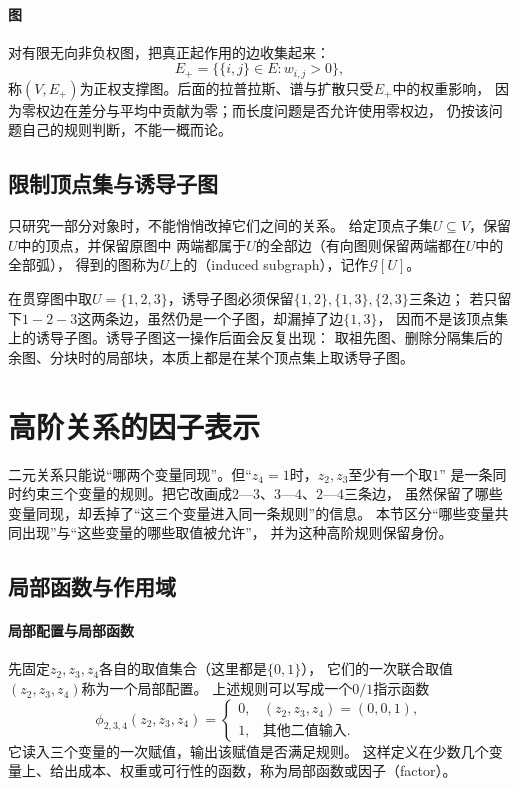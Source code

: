 \paragraph{图}
对有限无向非负权图，把真正起作用的边收集起来：
\[
  E_+=\bigl\{\{i,j\}\in E:w_{i,j}>0\bigr\},
\]
称$(V,E_+)$为正权支撑图。后面的拉普拉斯、谱与扩散只受$E_+$中的权重影响，
因为零权边在差分与平均中贡献为零；而长度问题是否允许使用零权边，
仍按该问题自己的规则判断，不能一概而论。

\subsection{限制顶点集与诱导子图}

只研究一部分对象时，不能悄悄改掉它们之间的关系。
给定顶点子集$U\subseteq V$，保留$U$中的顶点，并保留原图中
两端都属于$U$的全部边（有向图则保留两端都在$U$中的全部弧），
得到的图称为$U$上的（induced subgraph），记作$\mathcal G[U]$。

在贯穿图中取$U=\{1,2,3\}$，诱导子图必须保留$\{1,2\},\{1,3\},\{2,3\}$三条边；
若只留下$1-2-3$这两条边，虽然仍是一个子图，却漏掉了边$\{1,3\}$，
因而不是该顶点集上的诱导子图。诱导子图这一操作后面会反复出现：
取祖先图、删除分隔集后的余图、分块时的局部块，本质上都是在某个顶点集上取诱导子图。

\section{高阶关系的因子表示}
\label{sec:graph-theory-higher-order-scopes}

二元关系只能说“哪两个变量同现”。但“$z_4=1$时，$z_2,z_3$至少有一个取$1$”
是一条同时约束三个变量的规则。把它改画成$2$—$3$、$3$—$4$、$2$—$4$三条边，
虽然保留了哪些变量同现，却丢掉了“这三个变量进入同一条规则”的信息。
本节区分“哪些变量共同出现”与“这些变量的哪些取值被允许”，
并为这种高阶规则保留身份。

\subsection{局部函数与作用域}

\paragraph{局部配置与局部函数}
先固定$z_2,z_3,z_4$各自的取值集合（这里都是$\{0,1\}$），
它们的一次联合取值$(z_2,z_3,z_4)$称为一个局部配置。
上述规则可以写成一个$0/1$指示函数
\[
  \phi_{2,3,4}(z_2,z_3,z_4)=
  \begin{cases}
    0,&(z_2,z_3,z_4)=(0,0,1),\\
    1,&\text{其他二值输入}.
  \end{cases}
\]
它读入三个变量的一次赋值，输出该赋值是否满足规则。
这样定义在少数几个变量上、给出成本、权重或可行性的函数，称为局部函数或因子（factor）。

